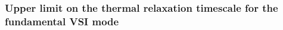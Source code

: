 

\subsubsection{Upper limit on the thermal relaxation timescale for the
  fundamental VSI mode}\label{iso_vsi_beta_crit}

